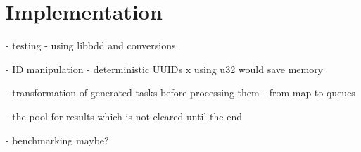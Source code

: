 \chapter{Implementation}
\label{chap:impl}

- testing - using libbdd and conversions

- ID manipulation - deterministic UUIDs x using u32 would save memory

- transformation of generated tasks before processing them - from map to queues

- the pool for results which is not cleared until the end

- benchmarking maybe?
